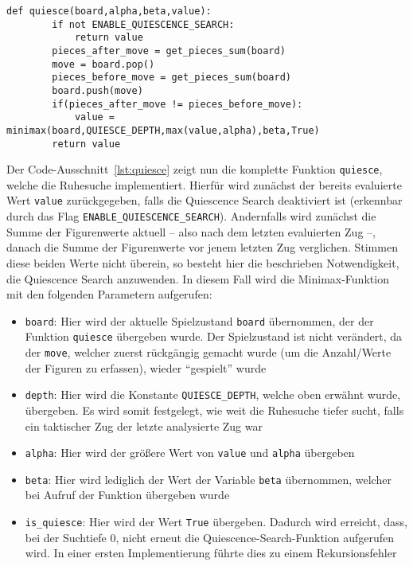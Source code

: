\begin{lstlisting}[caption=Funktion für die Implementierung der Ruhesuche, label=lst:quiesce]
	def quiesce(board,alpha,beta,value):
    	if not ENABLE_QUIESCENCE_SEARCH:
			return value
		pieces_after_move = get_pieces_sum(board)
		move = board.pop()
		pieces_before_move = get_pieces_sum(board)
		board.push(move)
		if(pieces_after_move != pieces_before_move):
			value = minimax(board,QUIESCE_DEPTH,max(value,alpha),beta,True)
		return value
\end{lstlisting}

Der Code-Ausschnitt~\ref{lst:quiesce} zeigt nun die komplette Funktion \texttt{quiesce}, welche die Ruhesuche implementiert. Hierfür wird zunächst der bereits evaluierte Wert \texttt{value} zurückgegeben, falls die Quiescence Search deaktiviert ist (erkennbar durch das Flag \texttt{ENABLE\_QUIESCENCE\_SEARCH}). Andernfalls wird zunächst die Summe der Figurenwerte aktuell -- also nach dem letzten evaluierten Zug --, danach die Summe der Figurenwerte vor jenem letzten Zug verglichen. Stimmen diese beiden Werte nicht überein, so besteht hier die beschrieben Notwendigkeit, die Quiescence Search anzuwenden. In diesem Fall wird die Minimax-Funktion mit den folgenden Parametern aufgerufen:

\begin{itemize}
	\item \texttt{board}: Hier wird der aktuelle Spielzustand \texttt{board} übernommen, der der Funktion \texttt{quiesce} übergeben wurde. Der Spielzustand ist nicht verändert, da der \texttt{move}, welcher zuerst rückgängig gemacht wurde (um die Anzahl/Werte der Figuren zu erfassen), wieder "`gespielt"' wurde
	\item \texttt{depth}: Hier wird die Konstante \texttt{QUIESCE\_DEPTH}, welche oben erwähnt wurde, übergeben. Es wird somit festgelegt, wie weit die Ruhesuche tiefer sucht, falls ein taktischer Zug der letzte analysierte Zug war
	\item \texttt{alpha}: Hier wird der größere Wert von \texttt{value} und \texttt{alpha} übergeben
	\item \texttt{beta}: Hier wird lediglich der Wert der Variable \texttt{beta} übernommen, welcher bei Aufruf der Funktion übergeben wurde
	\item \texttt{is\_quiesce}: Hier wird der Wert \texttt{True} übergeben. Dadurch wird erreicht, dass, bei der Suchtiefe $0$, nicht erneut die Quiescence-Search-Funktion aufgerufen wird. In einer ersten Implementierung führte dies zu einem Rekursionsfehler
\end{itemize}

